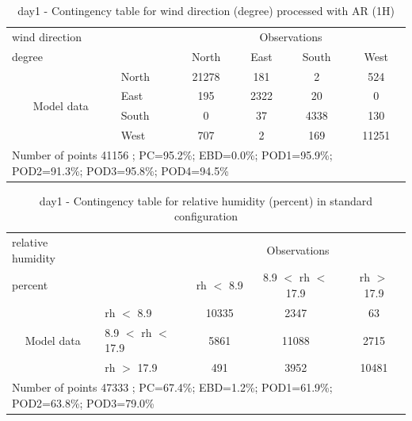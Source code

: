 \begin{table}[p!]
\begin{center}
\begin{tabular}{llcccc}
\hline
{wind direction}                                       &                                                    & \multicolumn{4}{c}{Observations}                 \\
{degree}                                       &                             & {North}   & {East} & {South} & {West} \\
\hline
\multicolumn{1}{c}{\multirow{4}{*}{Model data}}  & {North}              & 21278                & 181                       & 2              & 524\\
                                                 & {East}               & 195                & 2322                       & 20              & 0\\
                                                 & {South}              & 0                & 37                      & 4338             & 130\\
                                                 & {West}               & 707               & 2                      & 169             & 11251\\
\hline 
\multicolumn{6}{l}{ Number of points        41156 ; PC=95.2\%; EBD=0.0\%; POD1=95.9\%; POD2=91.3\%; POD3=95.8\%; POD4=94.5\%}                 \\
\end{tabular}
\end{center}
\caption{day1 - Contingency table for {wind direction} (degree) processed with AR (1H)}
\label{tab:contingencywdAFT:day1}
\end{table}
\begin{table}[p!]
\begin{center}
\begin{tabular}{llccc}
\hline
{relative humidity}                                       &                                                    & \multicolumn{3}{c}{Observations}                 \\
{percent}                                       &                             & rh $<$ 8.9   & 8.9 $<$ rh $<$ 17.9 & rh $>$ 17.9 \\
\hline
\multicolumn{1}{c}{\multirow{3}{*}{Model data}}  & rh $<$ 8.9             & 10335                & 2347                       & 63              \\
                                                 & 8.9  $<$ rh $<$ 17.9 & 5861                & 11088                       & 2715              \\
                                                 & rh $>$ 17.9             & 491                & 3952                       & 10481              \\
\hline
\multicolumn{5}{l}{ Number of points        47333 ; PC=67.4\%; EBD=1.2\%; POD1=61.9\%; POD2=63.8\%; POD3=79.0\%}
\end{tabular}
\end{center}
\caption{day1 - Contingency table for  relative humidity (percent) in standard configuration}
\label{tab:contingencyrhBEF:day1}
\end{table}
